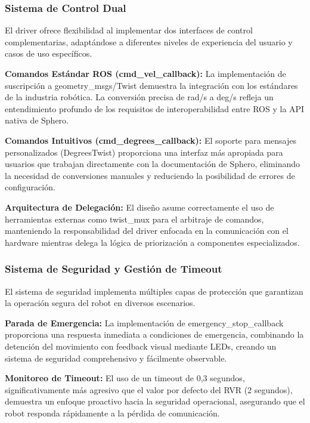 \documentclass[11pt]{article}
\newcommand{\code}[1]{\textcolor{codeblue}{\url{#1}}}
\numberwithin{figure}{section}
\numberwithin{table}{section}
\def\code#1{#1}%
\begin{document}
\subsubsection{Sistema de Control Dual}

El driver ofrece flexibilidad al implementar dos interfaces de control complementarias, adaptándose a diferentes niveles de experiencia del usuario y casos de uso específicos.

\textbf{Comandos Estándar ROS (\code{cmd\_vel\_callback}):} La implementación de suscripción a \code{geometry\_msgs/Twist} demuestra la integración con los estándares de la industria robótica. La conversión precisa de rad/s a deg/s refleja un entendimiento profundo de los requisitos de interoperabilidad entre ROS y la API nativa de Sphero.

\textbf{Comandos Intuitivos (\code{cmd\_degrees\_callback}):} El soporte para mensajes personalizados (DegreesTwist) proporciona una interfaz más apropiada para usuarios que trabajan directamente con la documentación de Sphero, eliminando la necesidad de conversiones manuales y reduciendo la posibilidad de errores de configuración.

\textbf{Arquitectura de Delegación:} El diseño asume correctamente el uso de herramientas externas como \code{twist\_mux} para el arbitraje de comandos, manteniendo la responsabilidad del driver enfocada en la comunicación con el hardware mientras delega la lógica de priorización a componentes especializados.


\subsubsection{Sistema de Seguridad y Gestión de Timeout}

El sistema de seguridad implementa múltiples capas de protección que garantizan la operación segura del robot en diversos escenarios.

\textbf{Parada de Emergencia:} La implementación de \code{emergency\_stop\_callback} proporciona una respuesta inmediata a condiciones de emergencia, combinando la detención del movimiento con feedback visual mediante LEDs, creando un sistema de seguridad comprehensivo y fácilmente observable.

\textbf{Monitoreo de Timeout:} El uso de un timeout de 0,3 segundos, significativamente más agresivo que el valor por defecto del RVR (2 segundos), demuestra un enfoque proactivo hacia la seguridad operacional, asegurando que el robot responda rápidamente a la pérdida de comunicación.
\end{document}
